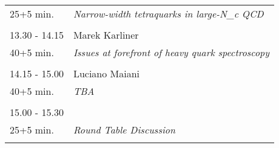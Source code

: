 \begin{longtable}{p{3cm}p{13cm}}
25+5 min. & {\it Narrow-width tetraquarks in large-N_c QCD}\\ 
 & \\ 
13.30 - 14.15 & Marek Karliner\\ 
40+5 min. & {\it Issues at forefront of heavy quark spectroscopy}\\ 
 & \\ 
14.15 - 15.00 & Luciano Maiani\\ 
40+5 min. & {\it TBA}\\ 
 & \\ 
15.00 - 15.30 & \\ 
25+5 min. & {\it Round Table Discussion}\\ 
 & \\ 
\end{longtable}

